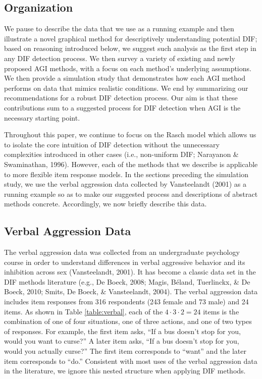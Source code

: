 \documentclass[
  english,
  man,floatsintext]{apa6}
\begin{document}
\hypertarget{organization}{%
\subsection{Organization}\label{organization}}

We pause to describe the data that we use as a running example and then illustrate a novel graphical method for descriptively understanding potential DIF; based on reasoning introduced below, we suggest such analysis as the first step in any DIF detection process. We then survey a variety of existing and newly proposed AGI methods, with a focus on each method's underlying assumptions. We then provide a simulation study that demonstrates how each AGI method performs on data that mimics realistic conditions. We end by summarizing our recommendations for a robust DIF detection process. Our aim is that these contributions sum to a suggested process for DIF detection when AGI is the necessary starting point.

Throughout this paper, we continue to focus on the Rasch model which allows us to isolate the core intuition of DIF detection without the unnecessary complexities introduced in other cases (i.e., non-uniform DIF; Narayanon \& Swaminathan, 1996). However, each of the methods that we describe is applicable to more flexible item response models. In the sections preceding the simulation study, we use the verbal aggression data collected by Vansteelandt (2001) as a running example so as to make our suggested process and descriptions of abstract methods concrete. Accordingly, we now briefly describe this data.

\hypertarget{verbal-aggression-data}{%
\subsection{Verbal Aggression Data}\label{verbal-aggression-data}}

The verbal aggression data was collected from an undergraduate psychology course in order to understand differences in verbal aggressive behavior and its inhibition across sex (Vansteelandt, 2001). It has become a classic data set in the DIF methods literature (e.g., De Boeck, 2008; Magis, Béland, Tuerlinckx, \& De Boeck, 2010; Smits, De Boeck, \& Vansteelandt, 2004). The verbal aggression data includes item responses from 316 respondents (243 female and 73 male) and 24 items. As shown in Table \ref{table:verbal}, each of the \(4 \cdot 3 \cdot 2 = 24\) items is the combination of one of four situations, one of three actions, and one of two types of responses. For example, the first item asks, ``If a bus doesn't stop for you, would you want to curse?'' A later item asks, ``If a bus doesn't stop for you, would you actually curse?'' The first item corresponds to ``want'' and the later item corresponds to ``do.'' Consistent with most uses of the verbal aggression data in the literature, we ignore this nested structure when applying DIF methods.
\end{document}

